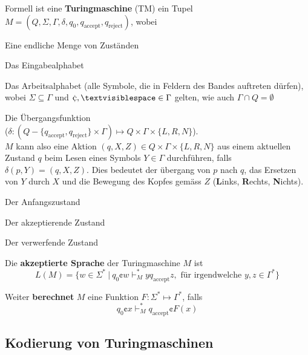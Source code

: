 \documentclass[11pt]{article}
\begin{document}
Formell ist eine \textbf{Turingmaschine} (TM) ein Tupel $M = (Q, \Sigma, \Gamma, \delta, q_0, q_\text{accept}, q_\text{reject})$, wobei

\begin{description}[labelindent=16pt,style=multiline,leftmargin=4.5cm, noitemsep]
	\item[$Q$:] Eine endliche Menge von Zust{\"a}nden
	\item[$\Sigma$:] Das Eingabealphabet
	\item[$\Gamma$:] Das Arbeitsalphabet (alle Symbole, die in Feldern des Bandes auftreten d{\"u}rfen), wobei $\Sigma \subseteq \Gamma$ und $\cent, \textvisiblespace \in \Gamma$ gelten, wie auch $\Gamma \cap Q = \emptyset$
	\item[$\delta$:] Die {\"U}bergangsfunktion\\ ($\delta: (Q-\{q_\text{accept}, q_\text{reject}\}\times\Gamma) \mapsto Q\times\Gamma\times\{L,R,N\}$).  \\$M$ kann also eine Aktion $(q, X, Z) \in Q \times \Gamma \times \{L, R, N\}$ aus einem aktuellen Zustand $q$ beim Lesen eines Symbols $Y \in \Gamma$ durchf{\"u}hren, falls $\delta(p, Y) = (q, X, Z)$. Dies bedeutet der {\"u}bergang von $p$ nach $q$, das Ersetzen von $Y$ durch $X$ und die Bewegung des Kopfes gem{\"a}ss $Z$ (\textbf{L}inks, \textbf{R}echts, \textbf{N}ichts).
	\item[$q_0 \in Q$:] Der Anfangszustand
	\item[$q_\text{\normalfont accept} \in Q$:] Der akzeptierende Zustand
	\item[$q_\text{\normalfont reject} \in Q-\{q_\text{\normalfont accept}\}$:] Der verwerfende Zustand
\end{description}

Die \textbf{akzeptierte Sprache} der Turingmaschine $M$ ist
\begin{equation*}
	L(M) = \{w \in \Sigma^*\ |\ q_0\cent w \vdash_M^* yq_\text{accept}z,\text{ f{\"u}r irgendwelche }y,z \in \Gamma^*\}
\end{equation*}

Weiter \textbf{berechnet} $M$ eine Funktion $F:\Sigma^* \mapsto \Gamma^*$, falls
\begin{equation*}
	q_0\cent x \vdash_M^* q_\text{accept}\cent F(x)
\end{equation*}

\subsection{Kodierung von Turingmaschinen}
\end{document}
